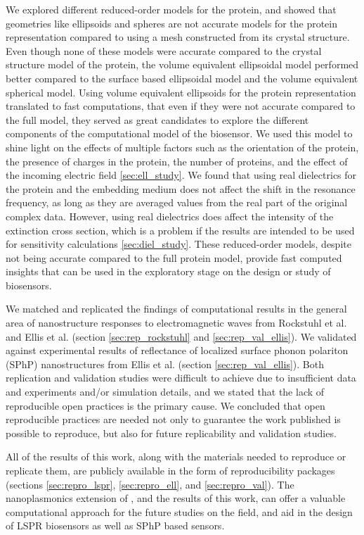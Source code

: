 We explored different reduced-order models for the protein, and showed that geometries like ellipsoids and spheres
are not accurate models for the protein representation compared to using a mesh constructed from its crystal structure. Even though
none of these models were accurate compared to the crystal structure model of the protein, the volume equivalent ellipsoidal model performed better 
compared to the surface based ellipsoidal model and the volume equivalent spherical model. Using volume equivalent ellipsoids for the protein representation 
translated to fast computations, that even if they were not accurate compared to the full model, they served as great candidates to
explore the different components of the computational model of the biosensor. We used this model to shine light on the effects of multiple factors such as 
the orientation of the protein, the presence of charges in the protein, the number of proteins, and the effect of the incoming electric field \ref{sec:ell_study}.
We found that using real dielectrics for the protein and the embedding medium does not affect the shift in the resonance frequency, 
as long as they are averaged values from the real part of the original complex data. However, using real dielectrics does affect the 
intensity of the extinction cross section, which is a problem if the results are intended to be used for sensitivity calculations \ref{sec:diel_study}. 
These reduced-order models, despite not being accurate compared to the full protein model, provide fast computed insights that can be used 
in the exploratory stage on the design or study of biosensors.

We matched and replicated the findings of computational results in the general area of nanostructure responses to electromagnetic waves 
from Rockstuhl et al. \cite{rockstuhl2005} and Ellis et al.\cite{ellis2016} (section \ref{sec:rep_rockstuhl} and \ref{sec:rep_val_ellis}). We validated
\pygbe against experimental results of reflectance of localized surface phonon polariton (SPhP) nanostructures from Ellis et 
al. (section \ref{sec:rep_val_ellis}). Both replication and validation studies were difficult to achieve due to insufficient data and experiments 
and/or simulation details, and we stated that the lack of reproducible open practices is the primary cause. We concluded that open reproducible 
practices are needed not only to guarantee the work published is possible to reproduce, but also for future replicability and validation studies. 

All of the results of this work, along with the materials needed to reproduce or replicate them, are publicly available in the form of 
reproducibility packages (sections \ref{sec:repro_lspr}, \ref{sec:repro_ell}, and \ref{sec:repro_val}). The nanoplasmonics extension of \pygbe, and 
the results of this work, can offer a valuable computational approach for the future studies on the field, and aid in the design of LSPR biosensors 
as well as SPhP based sensors. 


